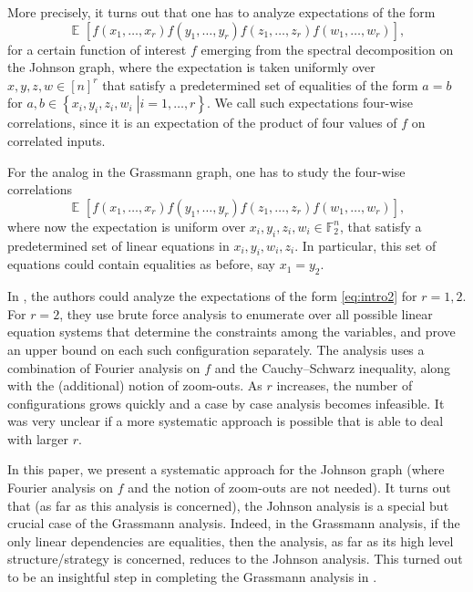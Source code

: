 \documentclass[11pt]{article}
\newcommand\sett[2]{\left\{ \left. #1 \;\right\vert #2 \right\}}
\newcommand\Expect[2]{{\mathop{\mathbb{E}}_{#1}\left[ {#2} \right]}}
\begin{document}
More precisely, it turns out that one has to analyze expectations of the form
\begin{equation}\label{eq:intro}
\Expect{}{f(x_1,\ldots,x_r)f(y_1,\ldots,y_r)f(z_1,\ldots,z_r)f(w_1,\ldots,w_r)},
\end{equation}
for a certain function of interest $f$ emerging from the spectral decomposition on the Johnson graph, %
where the expectation is taken
uniformly over $x,y,z,w\in [n]^r$ that satisfy a predetermined set of equalities of the form $a = b$ for $a,b\in\sett{x_i,y_i,z_i,w_i}{i=1,\ldots,r}$.
We call such expectations four-wise correlations, since it is an expectation of the product of four values of $f$ on correlated inputs.

For the analog in the Grassmann graph, %
 one has to study the four-wise correlations
\begin{equation}\label{eq:intro2}
\Expect{}{f(x_1,\ldots,x_r)f(y_1,\ldots,y_r)f(z_1,\ldots,z_r)f(w_1,\ldots,w_r)},
\end{equation}
where now the expectation is uniform over $x_i,y_i,z_i,w_i\in \mathbb{F}_2^{n}$, that satisfy a predetermined set of linear equations in $x_i,y_i,w_i,z_i$. In particular,
this set of equations could contain equalities as before, say $x_1 = y_2$.

In \cite{DKKMSgras}, the authors could analyze the expectations of the form \eqref{eq:intro2} for $r=1,2$. For $r=2$, they use brute force analysis to enumerate
over all possible linear equation systems that determine the constraints among the variables, and prove an upper bound on each such configuration separately. %
The analysis uses
a combination of Fourier analysis on $f$ and the Cauchy--Schwarz inequality, along with the (additional) notion of zoom-outs.
As $r$ increases, the number of configurations grows quickly and a case by case analysis becomes infeasible.
It was very unclear if a more systematic approach is possible that is able to deal with larger $r$.

In this paper, we present a systematic approach for the Johnson graph %
%
(where  %
Fourier analysis on $f$ and the notion of zoom-outs %
are  %
not needed).
It turns out that (as far as this analysis is concerned), the Johnson
analysis is a special but crucial case of the Grassmann analysis. Indeed,
in the Grassmann analysis, if the only linear dependencies are
equalities, then the analysis, as far as its high level
structure/strategy is concerned, reduces to the Johnson analysis. This
turned out to be an insightful step in completing the Grassmann analysis in
\cite{KMS2}.
\end{document}
